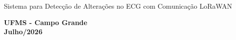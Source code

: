 \begin{titlepage}
\begin{center}
\end{center}

\vspace*{4cm}

\begin{flushright}
\begin{minipage}{10cm}
Sistema para Detecção de Alterações no ECG com Comunicação LoRaWAN
\end{minipage}
\end{flushright}

\vspace*{2cm}
\begin{center}
\textbf{UFMS - Campo Grande \\Julho/2026}
\end{center}
\cleardoublepage



\end{titlepage}
